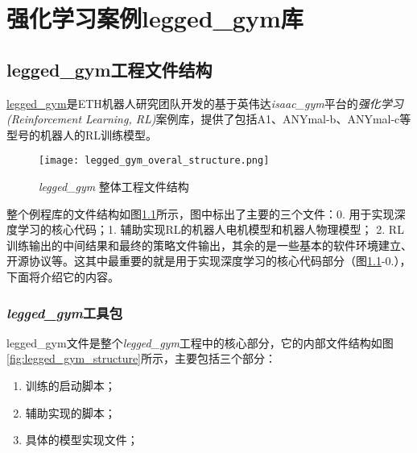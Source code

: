 
\chapter[强化学习案例legged\_gym库]{\label{section:legged_gym}强化学习案例legged\_gym库}



\section[legged\_gym工程文件结构]{legged\_gym工程文件结构\cite[p1]{Rudin_Hoeller_Reist_Hutter_2021}}
\href{https://leggedrobotics.github.io/legged_gym/}{legged\_gym}是ETH机器人研究团队开发的基于英伟达\emph{isaac\_gym}平台的\emph{强化学习(Reinforcement Learning, RL)}案例库，提供了包括A1、ANYmal-b、ANYmal-c等型号的机器人的RL训练模型。

\begin{figure}
  \centering
  \caption[\emph{legged\_gym} 整体工程文件结构]{\emph{legged\_gym} 整体工程文件结构}
  \label{fig:legged_gym_overal_structure}
  \texttt{[image: legged\_gym\_overal\_structure.png]}
\end{figure}

整个例程库的文件结构如图\ref{fig:legged_gym_overal_structure}所示，图中标出了主要的三个文件：0. 用于实现深度学习的核心代码；1. 辅助实现RL的机器人电机模型和机器人物理模型； 2. RL训练输出的中间结果和最终的策略文件输出，其余的是一些基本的软件环境建立、开源协议等。这其中最重要的就是用于实现深度学习的核心代码部分（图\ref{fig:legged_gym_overal_structure}-0.），下面将介绍它的内容。

\subsection[\emph{legged\_gym}工具包]{\emph{legged\_gym}工具包}
legged\_gym文件是整个\emph{legged\_gym}工程中的核心部分，它的内部文件结构如图\ref{fig:legged_gym_structure}所示，主要包括三个部分：
\begin{enumerate}
  \item 训练的启动脚本；
  \item 辅助实现的脚本；
  \item 具体的模型实现文件；
\end{enumerate}

